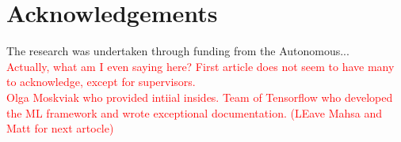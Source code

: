 \section{Acknowledgements}\label{sec:acknowledgements}
The research was undertaken through funding from the Autonomous... \\
\textcolor{red}{Actually, what am I even saying here? First article does not seem to have many to acknowledge, except for supervisors. \\
Olga Moskviak who provided intiial insides. Team of Tensorflow who developed the ML framework and wrote exceptional documentation. (LEave Mahsa and Matt for next artocle)}
